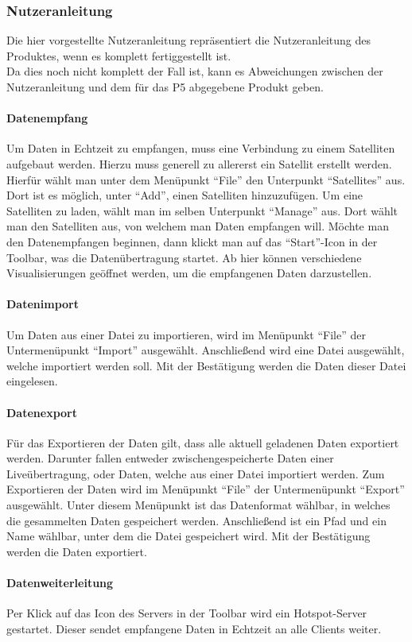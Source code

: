 \subsubsection{Nutzeranleitung}
Die hier vorgestellte Nutzeranleitung repräsentiert die Nutzeranleitung des Produktes, wenn es komplett fertiggestellt ist. \\
Da dies noch nicht komplett der Fall ist, kann es Abweichungen zwischen der Nutzeranleitung und dem für das P5 abgegebene Produkt geben.

\paragraph{Datenempfang}
Um Daten in Echtzeit zu empfangen, muss eine Verbindung zu einem Satelliten aufgebaut werden. Hierzu muss generell zu allererst ein Satellit erstellt werden. Hierfür wählt man unter dem Menüpunkt ``File'' den Unterpunkt ``Satellites'' aus. Dort ist es möglich, unter ``Add'', einen Satelliten hinzuzufügen. Um eine Satelliten zu laden, wählt man im selben Unterpunkt ``Manage'' aus. Dort wählt man den Satelliten aus, von welchem man Daten empfangen will. Möchte man den Datenempfangen beginnen, dann klickt man auf das ``Start''-Icon in der Toolbar, was die Datenübertragung startet. Ab hier können verschiedene Visualisierungen geöffnet werden, um die empfangenen Daten darzustellen.
\paragraph{Datenimport}
Um Daten aus einer Datei zu importieren, wird im Menüpunkt ``File'' der Untermenüpunkt ``Import'' ausgewählt. Anschließend wird eine Datei ausgewählt, welche importiert werden soll. Mit der Bestätigung werden die Daten dieser Datei eingelesen.
\paragraph{Datenexport}
Für das Exportieren der Daten gilt, dass alle aktuell geladenen Daten exportiert werden. Darunter fallen entweder zwischengespeicherte Daten einer Liveübertragung, oder Daten, welche aus einer Datei importiert werden.
Zum Exportieren der Daten wird im Menüpunkt ``File'' der Untermenüpunkt ``Export'' ausgewählt. Unter diesem Menüpunkt ist das Datenformat wählbar, in welches die gesammelten Daten gespeichert werden. Anschließend ist ein Pfad und ein Name wählbar, unter dem die Datei gespeichert wird. Mit der Bestätigung werden die Daten exportiert.
\paragraph{Datenweiterleitung}
Per Klick auf das Icon des Servers in der Toolbar wird ein Hotspot-Server gestartet. Dieser sendet empfangene Daten in Echtzeit an alle Clients weiter.
